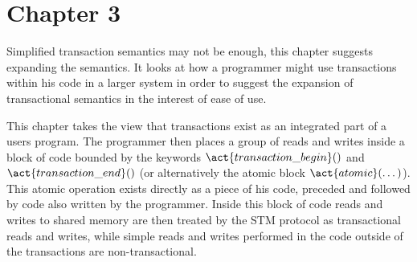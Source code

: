 % 














\section{Chapter 3}
Simplified transaction semantics may not be enough,
this chapter suggests expanding the semantics.
It looks at how a programmer might use transactions
within his code in a larger system in order to suggest the expansion of transactional
semantics in the interest of ease of use.



This chapter takes the view that transactions exist as an integrated part of
a users program.
The programmer then places a group of reads and writes
inside a block of code bounded by the keywords $\act{transaction\_begin}()$ and
$\act{transaction\_end}()$ (or alternatively the atomic block $\act{atomic}(\dots)$).
This atomic operation exists directly as a piece of his code, preceded
and followed by code also written by the programmer.
Inside this block of code reads and writes to shared memory are then
treated by the STM protocol as transactional reads and writes,
while simple reads and writes performed in the code outside of the transactions
are non-transactional.

